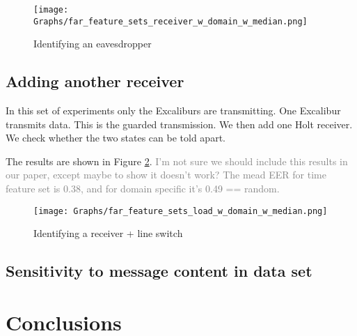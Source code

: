 \documentclass[conference]{IEEEtran}
\begin{document}
  \begin{figure}[t]
    \centering
    \texttt{[image: Graphs/far\_feature\_sets\_receiver\_w\_domain\_w\_median.png]}
    \caption{Identifying an eavesdropper}
    \label{fig:receiver_results}
  \end{figure}
  
\subsection{Adding another receiver}
  In this set of experiments only the Excaliburs are transmitting. One Excalibur transmits data. This is the guarded transmission. We then add one Holt receiver. We check whether the two states can be told apart.
  
  The results are shown in Figure \ref{fig:load_results}. \textcolor{gray}{I'm not sure we should include this results in our paper, except maybe to show it doesn't work? The mead EER for time feature set is 0.38, and for domain specific it's 0.49 == random.}
  
  \begin{figure}[t]
    \centering
    \texttt{[image: Graphs/far\_feature\_sets\_load\_w\_domain\_w\_median.png]}
    \caption{Identifying a receiver + line switch}
    \label{fig:load_results}
  \end{figure}
  

\subsection{Sensitivity to message content in data set}

\section{Conclusions}


 
\end{document}

